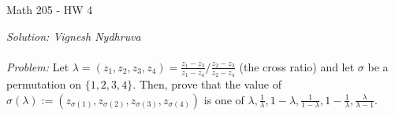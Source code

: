 

\begin{center}
	Math 205 - HW 4
\end{center} 

\noindent \textit{Solution: Vignesh Nydhruva} 
\\ 
\\
\textit{Problem: } Let $\lambda = (z_1,z_2,z_3,z_4) = \frac{z_1 - z_3}{z_1 - z_4} / \frac{z_2 - z_3}{z_2 - z_4}$ (the cross ratio) and let $\sigma$ be a permutation on $\{1,2,3,4\}$. Then, prove that the value of $\sigma(\lambda) := (z_{\sigma(1)}, z_{\sigma(2)}, z_{\sigma(3)}, z_{\sigma(4)})$ is one of $\lambda, \frac{1}{\lambda}, 1 - \lambda, \frac{1}{1-\lambda}, 1 - \frac{1}{\lambda}, \frac{\lambda}{\lambda - 1}$. 
\\
\\
